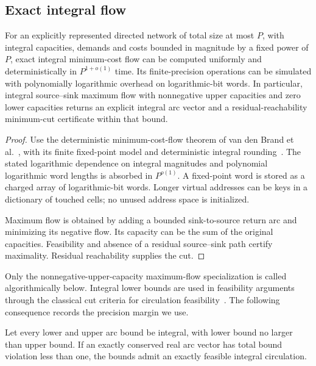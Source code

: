 \subsection{Exact integral flow}

\begin{lemma}\label{lem:integral-flow}
For an explicitly represented directed network of total size at most $P$,
with integral capacities, demands and costs bounded in magnitude by a fixed
power of $P$, exact integral minimum-cost flow can be computed uniformly and
deterministically in $P^{1+o(1)}$ time. Its finite-precision operations can
be simulated with polynomially logarithmic overhead on logarithmic-bit
words. In particular, integral source--sink maximum flow with nonnegative
upper capacities and zero lower capacities returns an explicit integral
arc vector and a residual-reachability minimum-cut certificate within that
bound.
\end{lemma}

\begin{proof}
Use the deterministic minimum-cost-flow theorem of van den Brand et
al.~\cite[Theorem~1.1]{FlowDeterministic}, with its finite fixed-point model
and deterministic integral rounding~\cite[Section~2 and Lemma~4.1]{FlowDeterministic}.
The stated logarithmic dependence on integral magnitudes and polynomial
logarithmic word lengths is absorbed in $P^{o(1)}$. A fixed-point word is
stored as a charged array of logarithmic-bit words. Longer virtual addresses
can be keys in a dictionary of touched cells; no unused address space is
initialized.

Maximum flow is obtained by adding a bounded sink-to-source return arc and
minimizing its negative flow. Its capacity can be the sum of the original
capacities. Feasibility and absence of a residual source--sink path certify
maximality. Residual reachability supplies the cut.
\end{proof}

Only the nonnegative-upper-capacity maximum-flow specialization is called
algorithmically below. Integral lower bounds are used in feasibility
arguments through the classical cut criteria for circulation
feasibility~\cite{Gale1957,FordFulkerson1958}. The following consequence
records the precision margin we use.

\begin{lemma}\label{prelim:small-violation}
Let every lower and upper arc bound be integral, with lower bound no larger
than upper bound. If an exactly conserved real arc vector has total bound
violation less than one, the bounds admit an exactly feasible integral
circulation.
\end{lemma}

